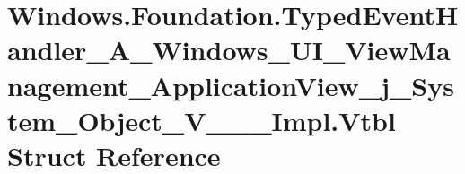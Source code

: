 \hypertarget{struct_windows_1_1_foundation_1_1_typed_event_handler___a___windows___u_i___view_management___apae42b7600dab322722f60f9705736124}{}\section{Windows.\+Foundation.\+Typed\+Event\+Handler\+\_\+\+A\+\_\+\+Windows\+\_\+\+U\+I\+\_\+\+View\+Management\+\_\+\+Application\+View\+\_\+j\+\_\+\+System\+\_\+\+Object\+\_\+\+V\+\_\+\+\_\+\+\_\+\+Impl.\+Vtbl Struct Reference}
\label{struct_windows_1_1_foundation_1_1_typed_event_handler___a___windows___u_i___view_management___apae42b7600dab322722f60f9705736124}
